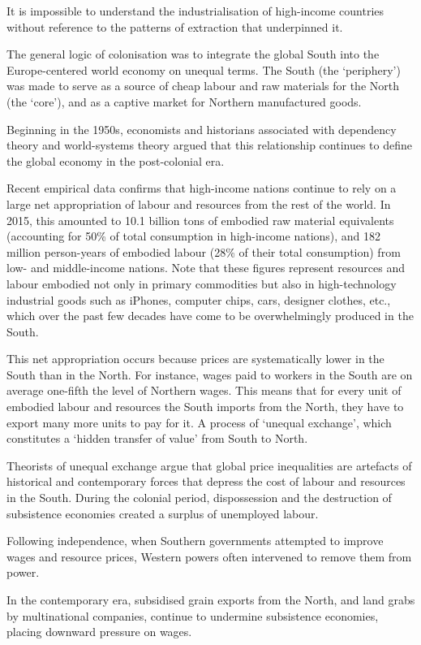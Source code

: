 \documentclass[
]{book}
\begin{document}
It is impossible to understand the industrialisation of high-income countries
without reference to the patterns of extraction that underpinned it.

The general logic of colonisation was to integrate the global South
into the Europe-centered world economy on unequal terms.
The South (the `periphery') was made to serve as a source of
cheap labour and raw materials for the North (the `core'),
and as a captive market for Northern manufactured goods.

Beginning in the 1950s, economists and historians associated with dependency theory
and world-systems theory argued that this relationship continues to
define the global economy in the post-colonial era.

Recent empirical data confirms that high-income nations continue to rely on
a large net appropriation of labour and resources from the rest of the world.
In 2015, this amounted to 10.1 billion tons of embodied raw material equivalents
(accounting for 50\% of total consumption in high-income nations),
and 182 million person-years of embodied labour (28\% of their total consumption)
from low- and middle-income nations.
Note that these figures represent resources and labour embodied not only
in primary commodities but also in high-technology industrial goods
such as iPhones, computer chips, cars, designer clothes, etc.,
which over the past few decades have come to be overwhelmingly produced
in the South.

This net appropriation occurs because prices are
systematically lower in the South than in the North.
For instance, wages paid to workers in the South are on average
one-fifth the level of Northern wages.
This means that for every unit of embodied labour and resources the South
imports from the North, they have to export many more units to pay for it.
A process of `unequal exchange', which constitutes a `hidden transfer of
value' from South to North.

Theorists of unequal exchange argue that global price inequalities are
artefacts of historical and contemporary forces that
depress the cost of labour and resources in the South.
During the colonial period, dispossession and the
destruction of subsistence economies created a surplus of unemployed labour.

Following independence, when Southern governments attempted to improve
wages and resource prices, Western powers often intervened to remove them from power.

In the contemporary era, subsidised grain exports from the North, and
land grabs by multinational companies, continue to undermine subsistence
economies, placing downward pressure on wages.
\end{document}
